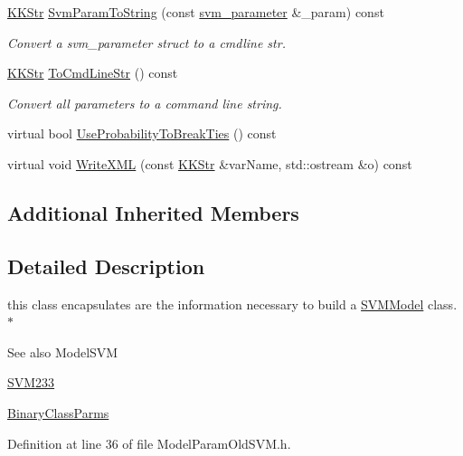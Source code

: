 \begin{DoxyCompactItemize}
\item 
\hyperlink{class_k_k_b_1_1_k_k_str}{K\+K\+Str} \hyperlink{class_k_k_m_l_l_1_1_model_param_old_s_v_m_ae41abc45584fa47bec84802404d941b2}{Svm\+Param\+To\+String} (const \hyperlink{class_k_k_m_l_l_1_1_model_param_old_s_v_m_ae96c3ff03f4145985df9225fdea5aa54}{svm\+\_\+parameter} \&\+\_\+param) const 
\begin{DoxyCompactList}\small\item\em Convert a svm\+\_\+parameter struct to a cmdline str. \end{DoxyCompactList}\item 
\hyperlink{class_k_k_b_1_1_k_k_str}{K\+K\+Str} \hyperlink{class_k_k_m_l_l_1_1_model_param_old_s_v_m_a9a387fc13e588958d64734c2129b2e00}{To\+Cmd\+Line\+Str} () const 
\begin{DoxyCompactList}\small\item\em Convert all parameters to a command line string. \end{DoxyCompactList}\item 
virtual bool \hyperlink{class_k_k_m_l_l_1_1_model_param_old_s_v_m_aaf6958c8e70fa5b723e5d99fb80c1b18}{Use\+Probability\+To\+Break\+Ties} () const 
\item 
virtual void \hyperlink{class_k_k_m_l_l_1_1_model_param_old_s_v_m_a93bd36e45a7be10e225872998a1470ee}{Write\+X\+ML} (const \hyperlink{class_k_k_b_1_1_k_k_str}{K\+K\+Str} \&var\+Name, std\+::ostream \&o) const 
\end{DoxyCompactItemize}
\subsection*{Additional Inherited Members}


\subsection{Detailed Description}
this class encapsulates are the information necessary to build a \hyperlink{class_k_k_m_l_l_1_1_s_v_m_model}{S\+V\+M\+Model} class. $\ast$

\begin{DoxySeeAlso}{See also}
Model\+S\+VM 

\hyperlink{namespace_s_v_m233}{S\+V\+M233} 

\hyperlink{class_k_k_m_l_l_1_1_binary_class_parms}{Binary\+Class\+Parms} 
\end{DoxySeeAlso}


Definition at line 36 of file Model\+Param\+Old\+S\+V\+M.\+h.



